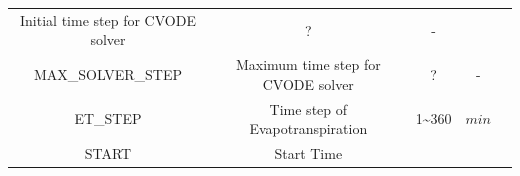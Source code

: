 \documentclass[]{scrbook}
\begin{document}
\begin{longtable}[]{@{}ccccc@{}}
\begin{minipage}[t]{0.23\columnwidth}
Initial time step for CVODE solver\strut
\end{minipage} & \begin{minipage}[t]{0.10\columnwidth}\centering\strut
?\strut
\end{minipage} & \begin{minipage}[t]{0.10\columnwidth}\centering\strut
-\strut
\end{minipage} & \begin{minipage}[t]{0.26\columnwidth}\centering\strut
\strut
\end{minipage}\tabularnewline
\begin{minipage}[t]{0.17\columnwidth}\centering\strut
MAX\_SOLVER\_STEP\strut
\end{minipage} & \begin{minipage}[t]{0.23\columnwidth}\centering\strut
Maximum time step for CVODE solver\strut
\end{minipage} & \begin{minipage}[t]{0.10\columnwidth}\centering\strut
?\strut
\end{minipage} & \begin{minipage}[t]{0.10\columnwidth}\centering\strut
-\strut
\end{minipage} & \begin{minipage}[t]{0.26\columnwidth}\centering\strut
\strut
\end{minipage}\tabularnewline
\begin{minipage}[t]{0.17\columnwidth}\centering\strut
ET\_STEP\strut
\end{minipage} & \begin{minipage}[t]{0.23\columnwidth}\centering\strut
Time step of Evapotranspiration\strut
\end{minipage} & \begin{minipage}[t]{0.10\columnwidth}\centering\strut
1\textasciitilde{}360\strut
\end{minipage} & \begin{minipage}[t]{0.10\columnwidth}\centering\strut
\(min\)\strut
\end{minipage} & \begin{minipage}[t]{0.26\columnwidth}\centering\strut
\strut
\end{minipage}\tabularnewline
\begin{minipage}[t]{0.17\columnwidth}\centering\strut
START\strut
\end{minipage} & \begin{minipage}[t]{0.23\columnwidth}\centering\strut
Start Time\strut
\end{minipage} & \begin{minipage}[t]{0.10\columnwidth}\centering\strut

\end{minipage}
\end{longtable}
\end{document}
